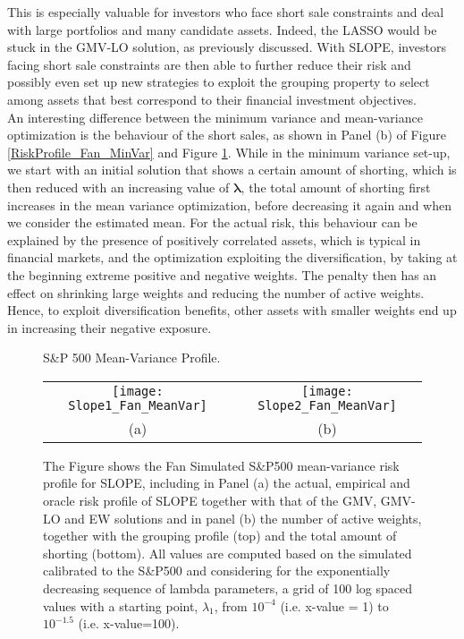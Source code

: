 \documentclass[12pt, a4paper]{article}
\begin{document}
%
This is especially valuable for investors who face short sale constraints and deal with large portfolios and many candidate assets. Indeed, the LASSO would be stuck in the GMV-LO solution, as previously discussed. With SLOPE, investors facing short sale constraints are then able to further reduce their risk and possibly even set up new strategies to exploit the grouping property to select among assets that best correspond to their financial investment objectives.\\
An interesting difference between the minimum variance and mean-variance optimization is the behaviour of the short sales, as shown in Panel (b) of Figure \ref{RiskProfile_Fan_MinVar} and Figure \ref{RiskProfile_Fan_MeanVar}. While in the minimum variance set-up, we start with an initial solution that shows a certain amount of shorting, which is then reduced with an increasing value of $\boldsymbol{\lambda}$, the total amount of shorting first increases in the mean variance optimization, before decreasing it again and when we consider the estimated mean. For the actual risk, this behaviour can be explained by the presence of positively correlated assets, which is typical in financial markets, and the optimization exploiting the diversification, by taking at the beginning extreme positive and negative weights. The penalty then has an effect on shrinking large weights and reducing the number of active weights. Hence, to exploit diversification benefits, other assets with smaller weights end up in increasing their negative exposure.\\
%
\begin{figure}[h!]
\centering
\caption{S\&P 500 Mean-Variance Profile.}\label{RiskProfile_Fan_MeanVar}
\begin{tabular}{cc}%
\texttt{[image: Slope1\_Fan\_MeanVar]} & \texttt{[image: Slope2\_Fan\_MeanVar]}\\
(a) & (b) \\
\end{tabular}
\captionsetup{font=scriptsize,labelfont=scriptsize, width=\textwidth}
\caption*{The Figure shows the Fan Simulated S\&P500 mean-variance risk profile for SLOPE, including in Panel (a) the actual, empirical and oracle risk profile of SLOPE together with that of the GMV, GMV-LO and EW solutions and in panel (b) the number of active weights, together with the grouping profile (top) and the total amount of shorting (bottom). All values are computed based on the \cite{Fan2008} simulated calibrated to the S\&P500 and considering for the exponentially decreasing sequence of lambda parameters, a grid of 100 log spaced values with a starting point, $\lambda_{1}$, from $10^{-4}$ (i.e. x-value = 1) to $10^{-1.5}$ (i.e. x-value=100).}
\end{figure}
\end{document}
